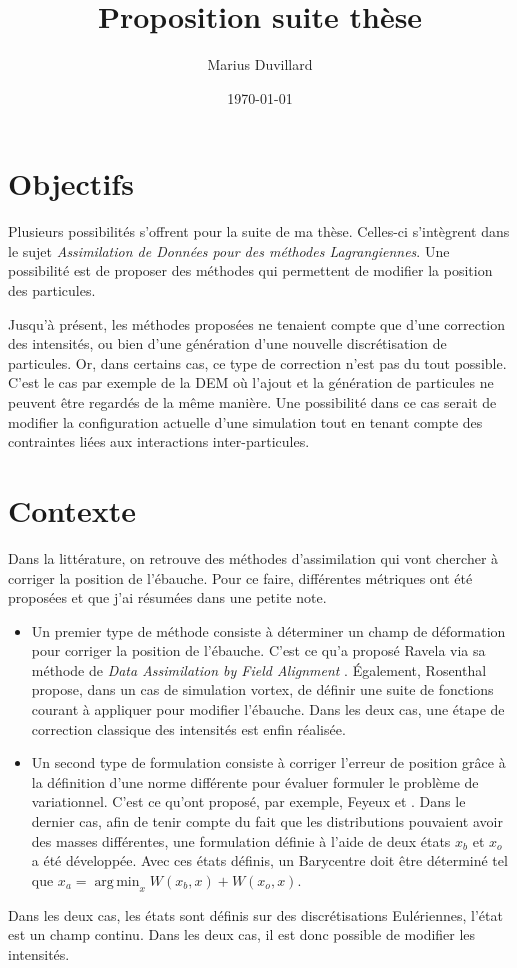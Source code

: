 \documentclass{article}
\DeclareMathOperator*{\argmin}{arg\,min}
\begin{document}
\title{Proposition suite thèse}
\author{Marius Duvillard}
\date{\today}
\maketitle

\tableofcontents

\section{Objectifs}
Plusieurs possibilités s'offrent pour la suite de ma thèse. Celles-ci s'intègrent dans le sujet \textit{Assimilation de Données pour des méthodes Lagrangiennes}. Une possibilité est de proposer des méthodes qui permettent de modifier la position des particules.

Jusqu'à présent, les méthodes proposées ne tenaient compte que d'une correction des intensités, ou bien d'une génération d'une nouvelle discrétisation de particules. Or, dans certains cas, ce type de correction n'est pas du tout possible. C'est le cas par exemple de la DEM où l'ajout et la génération de particules ne peuvent être regardés de la même manière.
Une possibilité dans ce cas serait de modifier la configuration actuelle d'une simulation tout en tenant compte des contraintes liées aux interactions inter-particules.

\section{Contexte}
Dans la littérature, on retrouve des méthodes d'assimilation qui vont chercher à corriger la position de l'ébauche. Pour ce faire, différentes métriques ont été proposées et que j'ai résumées dans une petite note.

\begin{itemize}
    \item Un premier type de méthode consiste à déterminer un champ de déformation pour corriger la position de l'ébauche. C'est ce qu'a proposé Ravela via sa méthode de \textit{Data Assimilation by Field Alignment} \cite{ravela_data_2007}. Également, Rosenthal \cite{rosenthal_displacement_2017} propose, dans un cas de simulation vortex, de définir une suite de fonctions courant à appliquer pour modifier l'ébauche. Dans les deux cas, une étape de correction classique des intensités est enfin réalisée.
    \item Un second type de formulation consiste à corriger l'erreur de position grâce à la définition d'une norme différente pour évaluer formuler le problème de variationnel. C'est ce qu'ont proposé, par exemple, Feyeux \cite{feyeux_transport_nodate} et \cite{bocquet_bridging_2023}. Dans le dernier cas, afin de tenir compte du fait que les distributions pouvaient avoir des masses différentes, une formulation définie à l'aide de deux états $x_b$ et $x_o$ a été développée. Avec ces états définis, un Barycentre doit être déterminé tel que $x_a = \argmin_{x} W(x_b, x) + W(x_o, x)$.
\end{itemize}
Dans les deux cas, les états sont définis sur des discrétisations Eulériennes, l'état est un champ continu. Dans les deux cas, il est donc possible de modifier les intensités.
\end{document}
